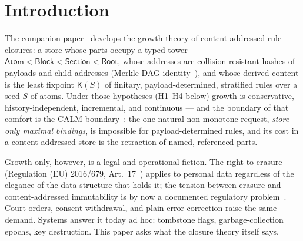 \documentclass[11pt]{article}
\theoremstyle{definition}
\theoremstyle{remark}
\newcommand{\K}{\mathsf{K}}
\begin{document}
\section{Introduction}\label{sec:intro}

The companion paper~\cite{growth} develops the growth theory of content-addressed rule closures: a store whose parts occupy a typed tower $\mathsf{Atom} < \mathsf{Block} < \mathsf{Section} < \mathsf{Root}$, whose addresses are collision-resistant hashes of payloads and child addresses (Merkle-DAG identity~\cite{Merkle87,Sanjuan20}), and whose derived content is the least fixpoint $\K(S)$ of finitary, payload-determined, stratified rules over a seed $S$ of atoms. Under those hypotheses (H1--H4 below) growth is conservative, history-independent, incremental, and continuous --- and the boundary of that comfort is the CALM boundary~\cite{Hellerstein10,AmelootNV13}: the one natural non-monotone request, \emph{store only maximal bindings}, is impossible for payload-determined rules, and its cost in a content-addressed store is the retraction of named, referenced parts.

Growth-only, however, is a legal and operational fiction. The right to erasure (Regulation (EU) 2016/679, Art.~17~\cite{GDPR}) applies to personal data regardless of the elegance of the data structure that holds it; the tension between erasure and content-addressed immutability is by now a documented regulatory problem~\cite{Finck19}. Court orders, consent withdrawal, and plain error correction raise the same demand. Systems answer it today ad hoc: tombstone flags, garbage-collection epochs, key destruction. This paper asks what the closure theory itself says.
\end{document}
